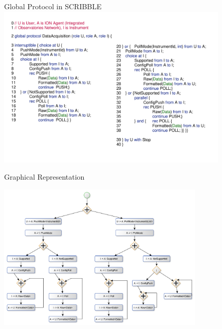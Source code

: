 \documentclass[8 pt]{beamer}
\begin{document}
\begin{frame}{Global Protocol in SCRIBBLE}
\includegraphics[width=11cm]{global-protocol}
\end{frame}

\begin{frame}{Graphical Representation}
\begin{center}
\includegraphics[height=7cm]{ooi_graph}
\end{center}
\end{frame}
\end{document}
